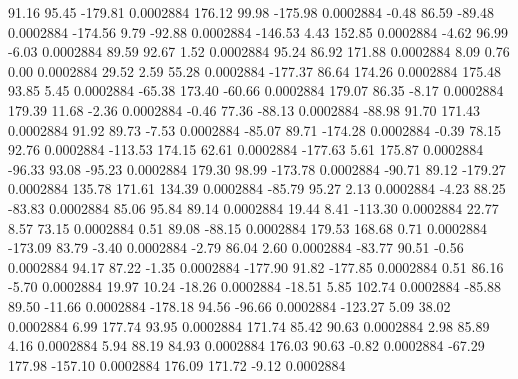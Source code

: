        91.16       95.45     -179.81     0.0002884
      176.12       99.98     -175.98     0.0002884
       -0.48       86.59      -89.48     0.0002884
     -174.56        9.79      -92.88     0.0002884
     -146.53        4.43      152.85     0.0002884
       -4.62       96.99       -6.03     0.0002884
       89.59       92.67        1.52     0.0002884
       95.24       86.92      171.88     0.0002884
        8.09        0.76        0.00     0.0002884
       29.52        2.59       55.28     0.0002884
     -177.37       86.64      174.26     0.0002884
      175.48       93.85        5.45     0.0002884
      -65.38      173.40      -60.66     0.0002884
      179.07       86.35       -8.17     0.0002884
      179.39       11.68       -2.36     0.0002884
       -0.46       77.36      -88.13     0.0002884
      -88.98       91.70      171.43     0.0002884
       91.92       89.73       -7.53     0.0002884
      -85.07       89.71     -174.28     0.0002884
       -0.39       78.15       92.76     0.0002884
     -113.53      174.15       62.61     0.0002884
     -177.63        5.61      175.87     0.0002884
      -96.33       93.08      -95.23     0.0002884
      179.30       98.99     -173.78     0.0002884
      -90.71       89.12     -179.27     0.0002884
      135.78      171.61      134.39     0.0002884
      -85.79       95.27        2.13     0.0002884
       -4.23       88.25      -83.83     0.0002884
       85.06       95.84       89.14     0.0002884
       19.44        8.41     -113.30     0.0002884
       22.77        8.57       73.15     0.0002884
        0.51       89.08      -88.15     0.0002884
      179.53      168.68        0.71     0.0002884
     -173.09       83.79       -3.40     0.0002884
       -2.79       86.04        2.60     0.0002884
      -83.77       90.51       -0.56     0.0002884
       94.17       87.22       -1.35     0.0002884
     -177.90       91.82     -177.85     0.0002884
        0.51       86.16       -5.70     0.0002884
       19.97       10.24      -18.26     0.0002884
      -18.51        5.85      102.74     0.0002884
      -85.88       89.50      -11.66     0.0002884
     -178.18       94.56      -96.66     0.0002884
     -123.27        5.09       38.02     0.0002884
        6.99      177.74       93.95     0.0002884
      171.74       85.42       90.63     0.0002884
        2.98       85.89        4.16     0.0002884
        5.94       88.19       84.93     0.0002884
      176.03       90.63       -0.82     0.0002884
      -67.29      177.98     -157.10     0.0002884
      176.09      171.72       -9.12     0.0002884
